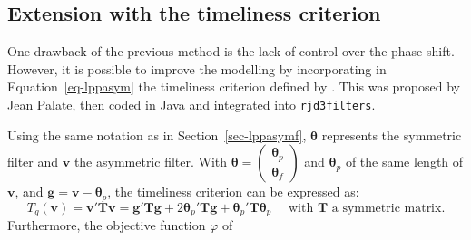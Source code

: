 \documentclass[
]{article}
\newcommand\1{\mathds{1}}
\begin{document}
\hypertarget{sec-lptimeliness}{%
\subsection{Extension with the timeliness
criterion}\label{sec-lptimeliness}}

One drawback of the previous method is the lack of control over the
phase shift. However, it is possible to improve the modelling by
incorporating in Equation~\ref{eq-lppasym} the timeliness criterion
defined by \textcite{ch15HBSA}. This was proposed by Jean Palate, then
coded in Java and integrated into \texttt{rjd3filters}.

Using the same notation as in Section~\ref{sec-lppasymf},
\(\boldsymbol\theta\) represents the symmetric filter and
\(\boldsymbol v\) the asymmetric filter. With
\(\boldsymbol\theta=\begin{pmatrix}\boldsymbol\theta_p\\\boldsymbol\theta_f\end{pmatrix}\)
and \(\boldsymbol\theta_p\) of the same length of \(\boldsymbol v\), and
\(\boldsymbol g=\boldsymbol v-\boldsymbol \theta_p\), the timeliness
criterion can be expressed as: \[
T_g(\boldsymbol v)=\boldsymbol v'\boldsymbol T\boldsymbol v=\boldsymbol g'\boldsymbol T\boldsymbol g+2\boldsymbol \theta_p'\boldsymbol T\boldsymbol g+\boldsymbol \theta_p'\boldsymbol T\boldsymbol \theta_p
\quad\text{ with }\boldsymbol T\text{ a symmetric matrix}.
\] Furthermore, the objective function \(\varphi\) of
\end{document}
